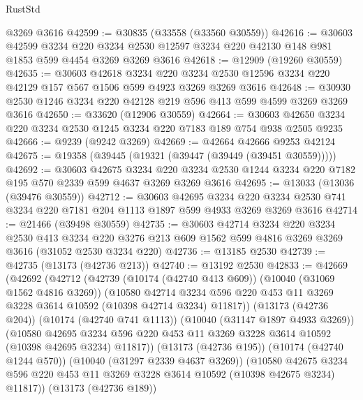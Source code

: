 \begin{lexlean}{RustStd}
\begin{coremodule}
    @3269
    @3616
@42599 := @30835 (@33558 (@33560 @30559))
@42616 := @30603
    @42599
    @3234
    @220
    @3234
    @2530
    @12597
    @3234
    @220
    @42130
    @148
    @981
    @1853
    @599
    @4454
    @3269
    @3269
    @3616
@42618 := @12909 (@19260 @30559)
@42635 := @30603
    @42618
    @3234
    @220
    @3234
    @2530
    @12596
    @3234
    @220
    @42129
    @157
    @567
    @1506
    @599
    @4923
    @3269
    @3269
    @3616
@42648 := @30930 @2530 @1246 @3234 @220 @42128 @219 @596 @413 @599 @4599 @3269 @3269 @3616
@42650 := @33620 (@12906 @30559)
@42664 := @30603 @42650 @3234 @220 @3234 @2530 @1245 @3234 @220 @7183 @189 @754 @938 @2505 @9235
@42666 := @9239 (@9242 @3269)
@42669 := @42664 @42666 @9253 @42124
@42675 := @19358 (@39445 (@19321 (@39447 (@39449 (@39451 @30559)))))
@42692 := @30603
    @42675
    @3234
    @220
    @3234
    @2530
    @1244
    @3234
    @220
    @7182
    @195
    @570
    @2339
    @599
    @4637
    @3269
    @3269
    @3616
@42695 := @13033 (@13036 (@39476 @30559))
@42712 := @30603
    @42695
    @3234
    @220
    @3234
    @2530
    @741
    @3234
    @220
    @7181
    @204
    @1113
    @1897
    @599
    @4933
    @3269
    @3269
    @3616
@42714 := @21466 (@39498 @30559)
@42735 := @30603
    @42714
    @3234
    @220
    @3234
    @2530
    @413
    @3234
    @220
    @3276
    @213
    @609
    @1562
    @599
    @4816
    @3269
    @3269
    @3616
    (@31052 @2530 @3234 @220)
@42736 := @13185 @2530
@42739 := @42735 (@13173 (@42736 @213))
@42740 := @13192 @2530
@42833 := @42669
    (@42692
      (@42712
        (@42739
          (@10174 (@42740 @413 @609))
          (@10040 (@31069 @1562 @4816 @3269))
          (@10580
            @42714
            @3234
            @596
            @220
            @453
            @11
            @3269
            @3228
            @3614
            @10592
            (@10398 @42714 @3234)
            @11817))
        (@13173 (@42736 @204))
        (@10174 (@42740 @741 @1113))
        (@10040 (@31147 @1897 @4933 @3269))
        (@10580
          @42695
          @3234
          @596
          @220
          @453
          @11
          @3269
          @3228
          @3614
          @10592
          (@10398 @42695 @3234)
          @11817))
      (@13173 (@42736 @195))
      (@10174 (@42740 @1244 @570))
      (@10040 (@31297 @2339 @4637 @3269))
      (@10580
        @42675
        @3234
        @596
        @220
        @453
        @11
        @3269
        @3228
        @3614
        @10592
        (@10398 @42675 @3234)
        @11817))
    (@13173 (@42736 @189))

\end{coremodule}
\end{lexlean}
